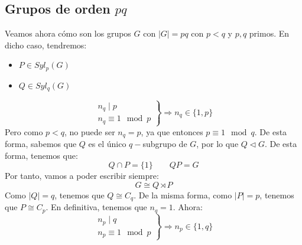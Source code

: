 \subsection{Grupos de orden $pq$}
Veamos ahora cómo son los grupos $G$ con $|G| = pq$ con $p<q$ y $p,q$ primos. En dicho caso, tendremos:
\begin{itemize}
    \item $P\in Syl_p(G)$
    \item $Q\in Syl_q(G)$
\end{itemize}
\begin{equation*}
    \left.\begin{array}{r}
        n_q \mid p \\
        n_q\equiv 1 \mod p
    \end{array}\right\} \Longrightarrow n_q \in \{1,p\}
\end{equation*}
Pero como $p<q$, no puede ser $n_q = p$, ya que entonces $p\equiv 1 \mod q$. De esta forma, sabemos que $Q$ es el único $q-$subgrupo de $G$, por lo que $Q\lhd G$. De esta forma, tenemos que:
\begin{equation*}
    Q\cap P = \{1\} \qquad QP = G
\end{equation*}
Por tanto, vamos a poder escribir siempre:
\begin{equation*}
    G \cong Q\rtimes P
\end{equation*}
Como $|Q| = q$, tenemos que $Q\cong C_q$. De la misma forma, como $|P| = p$, tenemos que $P\cong C_p$. En definitiva, tenemos que $n_q = 1$. Ahora:
\begin{equation*}
    \left.\begin{array}{r}
        n_p \mid q \\
        n_p \equiv 1 \mod p
    \end{array}\right\} \Longrightarrow n_p \in \{1,q\}
\end{equation*}
